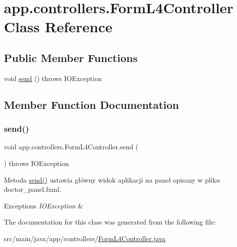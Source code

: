 \hypertarget{classapp_1_1controllers_1_1_form_l4_controller}{}\section{app.\+controllers.\+Form\+L4\+Controller Class Reference}
\label{classapp_1_1controllers_1_1_form_l4_controller}
\subsection*{Public Member Functions}
\begin{DoxyCompactItemize}
\item 
void \mbox{\hyperlink{classapp_1_1controllers_1_1_form_l4_controller_a1ac2febda4222a7163229e6cde197376}{send}} ()  throws I\+O\+Exception 
\end{DoxyCompactItemize}


\subsection{Member Function Documentation}
\mbox{\label{classapp_1_1controllers_1_1_form_l4_controller_a1ac2febda4222a7163229e6cde197376}} 
\subsubsection{\texorpdfstring{send()}{send()}}
{\footnotesize\ttfamily void app.\+controllers.\+Form\+L4\+Controller.\+send (\begin{DoxyParamCaption}{ }\end{DoxyParamCaption}) throws I\+O\+Exception}

Metoda \mbox{\hyperlink{classapp_1_1controllers_1_1_form_l4_controller_a1ac2febda4222a7163229e6cde197376}{send()}} ustawia główny widok aplikacji na panel opisany w pliku doctor\+\_\+panel.\+fxml. 
\begin{DoxyExceptions}{Exceptions}
{\em I\+O\+Exception} & \\
\hline
\end{DoxyExceptions}


The documentation for this class was generated from the following file\+:\begin{DoxyCompactItemize}
\item 
src/main/java/app/controllers/\mbox{\hyperlink{_form_l4_controller_8java}{Form\+L4\+Controller.\+java}}\end{DoxyCompactItemize}
